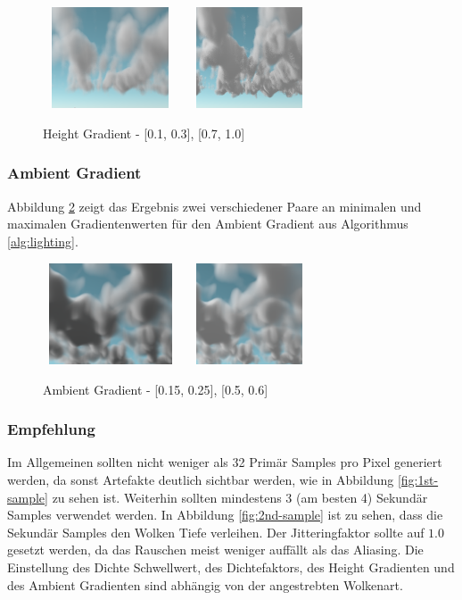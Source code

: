 \begin{figure}[H]
    \centering
    \includegraphics[width=4cm, height=3cm]{figures/hg-low.png}
    \includegraphics[width=4cm, height=3cm]{figures/hg-high.png}
    \caption{Height Gradient - [0.1, 0.3], [0.7, 1.0]}
    \label{fig:height-gradient}
\end{figure}

\subsubsection{Ambient Gradient}
Abbildung \ref{fig:ambient-gradient} zeigt das Ergebnis zwei verschiedener Paare an minimalen und maximalen Gradientenwerten für den Ambient Gradient aus Algorithmus \ref{alg:lighting}.

\begin{figure}[H]
    \centering
    \includegraphics[width=4cm, height=3cm]{figures/ag-low.png}
    \includegraphics[width=4cm, height=3cm]{figures/ag-high.png}
    \caption{Ambient Gradient - [0.15, 0.25], [0.5, 0.6]}
    \label{fig:ambient-gradient}
\end{figure}

\subsubsection{Empfehlung}
Im Allgemeinen sollten nicht weniger als 32 Primär Samples pro Pixel generiert werden, da sonst Artefakte deutlich sichtbar werden, wie in Abbildung \ref{fig:1st-sample} zu sehen ist. Weiterhin sollten mindestens 3 (am besten 4) Sekundär Samples verwendet werden. In Abbildung \ref{fig:2nd-sample} ist zu sehen, dass die Sekundär Samples den Wolken Tiefe verleihen. Der Jitteringfaktor sollte auf $ 1.0 $ gesetzt werden, da das Rauschen meist weniger auffällt als das Aliasing. Die Einstellung des Dichte Schwellwert, des Dichtefaktors, des Height Gradienten und des Ambient Gradienten sind abhängig von der angestrebten Wolkenart.

